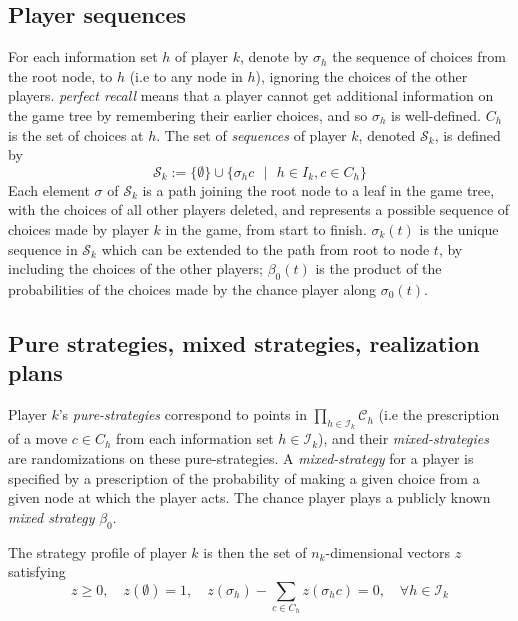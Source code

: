 \documentclass{article} %
\begin{document}
\subsection{Player sequences}
For each information set $h$ of player $k$, denote by $\sigma_h$  the sequence of choices from the root node, to $h$ (i.e to any node in $h$), ignoring the choices of the other players. \textit{perfect recall} means that a player cannot get additional information on the game tree by remembering their earlier choices, and so $\sigma_h$ is well-defined. $C_h$ is the set of choices at $h$. The set of \textit{sequences} of player $k$, denoted $\mathcal{S}_k$, is defined by 
\begin{equation}
\mathcal{S}_k := \{\emptyset\} \cup \{\sigma_h c\text{ } |\text{ } h \in I_k, c \in C_h\}
\end{equation}
Each element $\sigma$ of $\mathcal{S}_k$ is a path joining the root node to a leaf in the game tree, with the choices of all other players deleted, and represents a possible sequence of choices made by player $k$ in the game, from start to finish. $\sigma_k(t)$ is the unique sequence in $\mathcal{S}_k$ which can be extended to the path from root to node $t$, by including the choices of the other players;
$\beta_0(t)$ is the product of the probabilities of the choices made by the chance player along $\sigma_0(t)$.

\subsection{Pure strategies, mixed strategies, realization plans}
Player $k$'s \textit{pure-strategies} correspond to points in $\prod_{h \in \mathcal{I}_k}{\mathcal{C}_h}$ (i.e the prescription of a move $c \in C_h$ from each information set $h \in \mathcal{I}_k$), and their \textit{mixed-strategies} are randomizations on these pure-strategies. A \textit{mixed-strategy} for a player is specified by a prescription of the probability of making a given choice from a given node at which the player acts. The chance player plays a publicly known \textit{mixed strategy} $\beta_0$.

The strategy profile of player $k$ is then the set of $n_k$-dimensional vectors $z$ satisfying
\begin{equation}
  z \geq 0,\hspace{1em}z(\emptyset) = 1,\hspace{1em}
    z(\sigma_h) - \sum_{c \in C_h}{z(\sigma_h c)} = 0, \hspace{1em} \forall h \in \mathcal{I}_k
  \label{eq:lin}
\end{equation}
\end{document}
